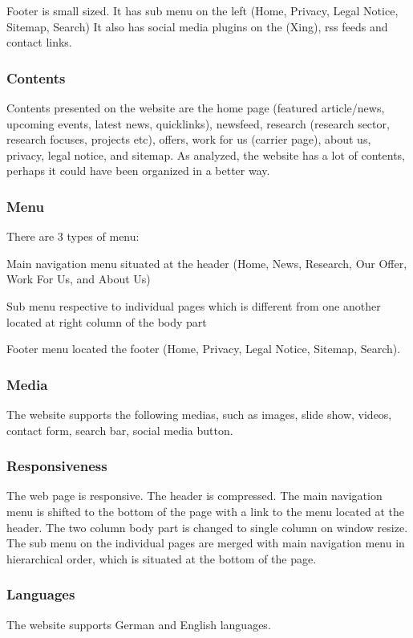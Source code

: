 Footer is small sized. It has sub menu on the left (Home, Privacy, Legal Notice, Sitemap, Search) It also has social media plugins on the (Xing), \ac{rss} feeds and contact links.

\subsubsection*{Contents}
Contents presented on the website are the home page (featured article/news, upcoming events, latest news, quicklinks), newsfeed, research (research sector, research focuses, projects etc), offers, work for us (carrier page), about us, privacy, legal notice, and sitemap. As analyzed, the website has a lot of contents, perhaps it could have been organized in a better way.

\subsubsection*{Menu}
There are 3 types of menu:
\begin{itemize*}
\item Main navigation menu situated at the header (Home, News, Research, Our Offer, Work For Us, and About Us)
\item Sub menu respective to individual pages which is different from one another located at right column of the body part
\item Footer menu located the footer (Home, Privacy, Legal Notice, Sitemap, Search).
\end{itemize*}

\subsubsection*{Media}
The website supports the following medias, such as images, slide show, videos, contact form, search bar, social media button.

\subsubsection*{Responsiveness}
The web page is responsive. The header is compressed. The main navigation menu is shifted to the bottom of the page with a link to the menu located at the header. The two column body part is changed to single column on window resize. The sub menu on the individual pages are merged with main navigation menu in hierarchical order, which is situated at the bottom of the page.

\subsubsection*{Languages}
The website supports German and English languages.

